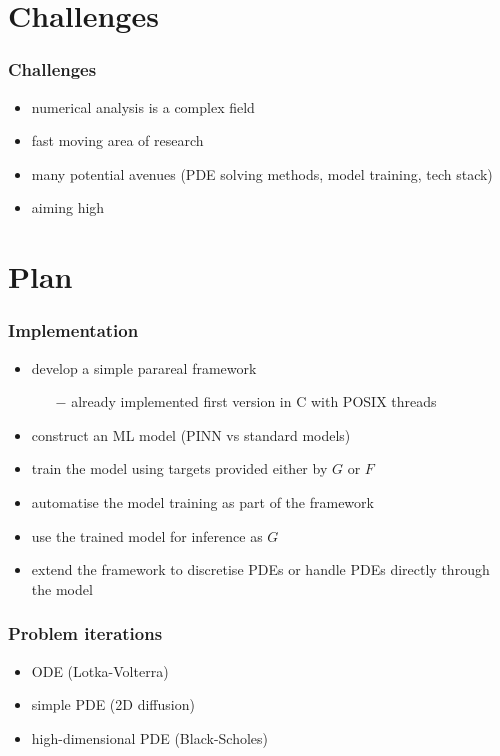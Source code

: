 \documentclass[xcolor=x11names,compress,usenames,dvipsnames,mathsans]{beamer}
\begin{document}
\section{Challenges}

\begin{frame}
\frametitle{Challenges}
\begin{itemize}
    \item numerical analysis is a complex field
    \item fast moving area of research
    \item many potential avenues (PDE solving methods, model training, tech stack)
    \item aiming high
\end{itemize}
\end{frame}


\section{Plan}

\begin{frame}
\frametitle{Implementation}
\begin{itemize}
    \item develop a simple parareal framework
    \begin{itemize}
        \item[$-$] already implemented first version in C with POSIX threads 
    \end{itemize}
    \item construct an ML model (PINN vs standard models)
    \item train the model using targets provided either by $G$ or $F$
    \item automatise the model training as part of the framework
    \item use the trained model for inference as $G$
    \item extend the framework to discretise PDEs or handle PDEs directly through the model
\end{itemize}
\end{frame}

\begin{frame}
\frametitle{Problem iterations}
\begin{itemize}
    \item ODE (Lotka-Volterra)
    \item simple PDE (2D diffusion)
    \item high-dimensional PDE (Black-Scholes)
\end{itemize}
\end{frame}
\end{document}
